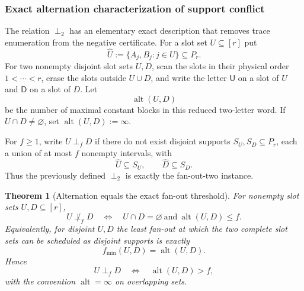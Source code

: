 \documentclass[11pt]{article}
\newtheorem{theorem}[definition]{Theorem}
\begin{document}
\subsubsection{Exact alternation characterization of support conflict}
\label{subsubsec:alternation-conflict}

The relation $\perp_2$ has an elementary exact description that removes trace
enumeration from the negative certificate.  For a slot set $U\subseteq[r]$ put
\[
 \widehat U:=\{A_j,B_j:j\in U\}\subseteq P_r.
\]
For two nonempty disjoint slot sets $U,D$, scan the slots in their physical
order $1<\cdots<r$, erase the slots outside $U\cup D$, and write the letter
$\mathsf U$ on a slot of $U$ and $\mathsf D$ on a slot of $D$.  Let
\[
 \operatorname{alt}(U,D)
\]
be the number of maximal constant blocks in this reduced two-letter word.  If
$U\cap D\ne\varnothing$, set $\operatorname{alt}(U,D):=\infty$.

For $f\ge1$, write $U\perp_fD$ if there do not exist disjoint supports
$S_U,S_D\subseteq P_r$, each a union of at most $f$ nonempty intervals, with
\[
 \widehat U\subseteq S_U,
 \qquad
 \widehat D\subseteq S_D.
\]
Thus the previously defined $\perp_2$ is exactly the fan-out-two instance.

\begin{theorem}[Alternation equals the exact fan-out threshold]
\label{thm:alternation-fanout-threshold}
For nonempty slot sets $U,D\subseteq[r]$,
\[
 \boxed{
 U\not\perp_fD
 \quad\Longleftrightarrow\quad
 U\cap D=\varnothing
 \ \text{and}\ 
 \operatorname{alt}(U,D)\le f.
 }
\]
Equivalently, for disjoint $U,D$ the least fan-out at which the two complete
slot sets can be scheduled as disjoint supports is exactly
\[
 \boxed{
 f_{\min}(U,D)=\operatorname{alt}(U,D).
 }
\]
Hence
\[
 \boxed{
 U\perp_fD
 \quad\Longleftrightarrow\quad
 \operatorname{alt}(U,D)>f,
 }
\]
with the convention $\operatorname{alt}=\infty$ on overlapping sets.
\end{theorem}
\end{document}
